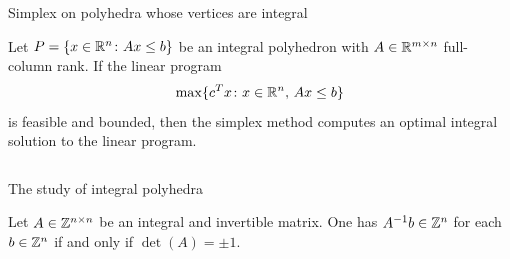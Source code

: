  

\begin{frame}{Simplex on polyhedra whose vertices are integral}

  
\begin{lemma}
  \label{lem:9}
  Let $P = \{ x \in \mathbb{R}^n \colon Ax\leq b\}$ be an integral polyhedron with $A
  \in \mathbb{R}^{m\times n}$ full-column rank. If the linear program 
  \begin{equation}
    \label{eq:44}
    \max\{c^Tx \colon x \in \mathbb{R}^n, \, Ax\leq b\}
  \end{equation}
  is feasible and bounded, then the simplex method computes an optimal
  integral solution to the linear program. 
\end{lemma}


   \begin{columns}
    \begin{column}{.5\textwidth}
      
    \end{column}
    \begin{column}{.5\textwidth}
      
    \end{column}       
  \end{columns}
\end{frame}




\begin{frame}{The study of integral polyhedra}

  \begin{lemma}
  \label{po:lem:6}
  Let $A\in \mathbb{Z}^{n\times n}$ be an integral and invertible matrix. One has
  $A^{-1}b \in \mathbb{Z}^n$ for each $b \in \mathbb{Z}^n$ if and only if $\det(A)=\pm 1$.
\end{lemma}



   \begin{columns}
    \begin{column}{.5\textwidth}
      
    \end{column}
    \begin{column}{.5\textwidth}
      
    \end{column}       
  \end{columns}
\end{frame}




